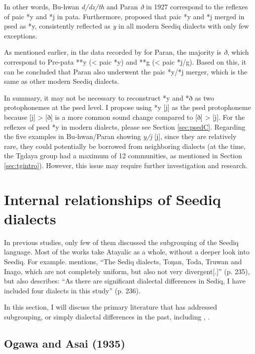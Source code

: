 In other words, Bu-hwan \textit{d/dz/th} and Paran \textit{ð} in 1927 correspond to the reflexes of \acl{paic} *y and *j in \acl{pata}. Furthermore, \textcite{song2023Aicgprime} proposed that \acl{paic} *y and *j merged in \acl{psed} as *y, consistently reflected as \textit{y} in all modern Seediq dialects with only few exceptions.

As mentioned earlier, in the data recorded by \textcite{asai1953sedik} for Paran, the majority is \textit{ð}, which correspond to Pre-\acl{pata} **y (< \ac{paic} *y) and **g (< \ac{paic} *j/g). Based on this, it can be concluded that Paran also underwent the \acl{paic} *y/*j merger, which is the same as other modern Seediq dialects. 

In summary, it may not be necessary to reconstruct *y and *ð as two protophonemes at the \acl{psed} level. I propose using *y [j] as the \acl{psed} protophoneme because [j] > [ð] is a more common sound change compared to [ð] > [j]. For the reflexes of \acl{psed} *y in modern dialects, please see Section \ref{sec:psedC}. Regarding the five examples in Bu-hwan/Paran showing \textit{y/j} [j], since they are relatively rare, they could potentially be borrowed from neighboring dialects (at the time, the Tgdaya group had a maximum of 12 communities, as mentioned in Section \ref{sec:tgintro}). However, this issue may require further investigation and research.

\section{Internal relationships of Seediq dialects} \label{sec:subgrouping_lit}

In previous studies, only few of them discussed the subgrouping of the Seediq language. Most of the works take Atayalic as a whole, without a deeper look into Seediq. For example. \textcite{li1981paic} mentions, ``The Sediq dialects, Toŋan, Toda, Truwan and Inago, which are not completely uniform, but also not very divergent[.]'' (p. 235), but also describes: ``As there are significant dialectal differences in Sediq, I have included four dialects in this study'' (p. 236).

In this section, I will discuss the primary literature that has addressed subgrouping, or simply dialectal differences in the past, including \textcite{ogawaandasai1935}, \textcite{Chengetal2017Truku, Chengetal2019Tgdaya, Sung2018Sedgrammar}.

\subsection{Ogawa and Asai (1935)}

